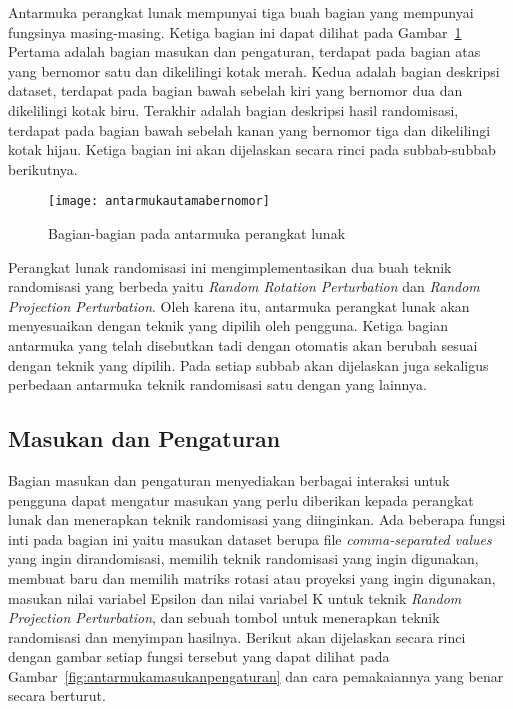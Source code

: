 Antarmuka perangkat lunak mempunyai tiga buah bagian yang mempunyai fungsinya masing-masing. Ketiga bagian ini dapat dilihat pada Gambar~\ref{fig:antarmukautamabernomor} Pertama adalah bagian masukan dan pengaturan, terdapat pada bagian atas yang bernomor satu dan dikelilingi kotak merah. Kedua adalah bagian deskripsi dataset, terdapat pada bagian bawah sebelah kiri yang bernomor dua dan dikelilingi kotak biru. Terakhir adalah bagian deskripsi hasil randomisasi, terdapat pada bagian bawah sebelah kanan yang bernomor tiga dan dikelilingi kotak hijau. Ketiga bagian ini akan dijelaskan secara rinci pada subbab-subbab berikutnya.

\begin{figure}
	\centering
	\texttt{[image: antarmukautamabernomor]}
	\caption{Bagian-bagian pada antarmuka perangkat lunak}
	\label{fig:antarmukautamabernomor}
\end{figure}

Perangkat lunak randomisasi ini mengimplementasikan dua buah teknik randomisasi yang berbeda yaitu \textit{Random Rotation Perturbation} dan \textit{Random Projection Perturbation}. Oleh karena itu, antarmuka perangkat lunak akan menyesuaikan dengan teknik yang dipilih oleh pengguna. Ketiga bagian antarmuka yang telah disebutkan tadi dengan otomatis akan berubah sesuai dengan teknik yang dipilih. Pada setiap subbab akan dijelaskan juga sekaligus perbedaan antarmuka teknik randomisasi satu dengan yang lainnya.

\subsection{Masukan dan Pengaturan}
\label{sec:masukanpengaturan}

Bagian masukan dan pengaturan menyediakan berbagai interaksi untuk pengguna dapat mengatur masukan yang perlu diberikan kepada perangkat lunak dan menerapkan teknik randomisasi yang diinginkan. Ada beberapa fungsi inti pada bagian ini yaitu masukan dataset berupa file \textit{comma-separated values} yang ingin dirandomisasi, memilih teknik randomisasi yang ingin digunakan, membuat baru dan memilih matriks rotasi atau proyeksi yang ingin digunakan, masukan nilai variabel Epsilon dan nilai variabel K untuk teknik \textit{Random Projection Perturbation}, dan sebuah tombol untuk menerapkan teknik randomisasi dan menyimpan hasilnya. Berikut akan dijelaskan secara rinci dengan gambar setiap fungsi tersebut yang dapat dilihat pada Gambar~\ref{fig:antarmukamasukanpengaturan} dan cara pemakaiannya yang benar secara berturut. 


